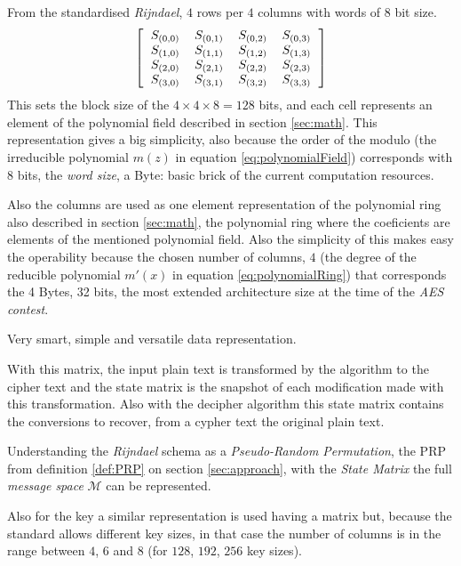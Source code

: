 \documentclass[10pt,a4paper,twoside]{llncs}
\begin{document}
From the standardised \emph{Rijndael}, $4$ rows per $4$ columns with words of $8$ bit size.
\begin{equation}\label{eq:stateMatrix}
 \left[
 \begin{tabular}{cccc}
  $S_{(0,0)}$ & $S_{(0,1)}$ & $S_{(0,2)}$ & $S_{(0,3)}$ \\
  $S_{(1,0)}$ & $S_{(1,1)}$ & $S_{(1,2)}$ & $S_{(1,3)}$ \\
  $S_{(2,0)}$ & $S_{(2,1)}$ & $S_{(2,2)}$ & $S_{(2,3)}$ \\
  $S_{(3,0)}$ & $S_{(3,1)}$ & $S_{(3,2)}$ & $S_{(3,3)}$ \\
 \end{tabular}
 \right]
\end{equation}
This sets the block size of the $4\times4\times8=128$ bits, and each cell represents an element of the polynomial field described in section \ref{sec:math}. This representation gives a big simplicity, also because the order of the modulo (the irreducible polynomial $m(z)$ in equation \ref{eq:polynomialField}) corresponds with $8$ bits, the \emph{word size}, a Byte: basic brick of the current computation resources.

Also the columns are used as one element representation of the polynomial ring also described in section \ref{sec:math}, the polynomial ring where the coeficients are elements of the mentioned polynomial field. Also the simplicity of this makes easy the operability because the chosen number of columns, $4$ (the degree of the reducible polynomial $m'(x)$ in equation \ref{eq:polynomialRing}) that corresponds the 4 Bytes, 32 bits, the most extended architecture size at the time of the \emph{AES contest}.

Very smart, simple and versatile data representation.

With this matrix, the input plain text is transformed by the algorithm to the cipher text and the state matrix is the snapshot of each modification made with this transformation. Also with the decipher algorithm this state matrix contains the conversions to recover, from a cypher text the original plain text.

Understanding the \emph{Rijndael} schema as a \emph{Pseudo-Random Permutation}, the PRP from definition \ref{def:PRP} on section \ref{sec:approach}, with the \emph{State Matrix} the full \emph{message space} $\mathcal{M}$ can be represented.

Also for the key a similar representation is used having a matrix but, because the standard allows different key sizes, in that case the number of columns is in the range between $4$, $6$ and $8$ (for $128$, $192$, $256$ key sizes).
\end{document}
